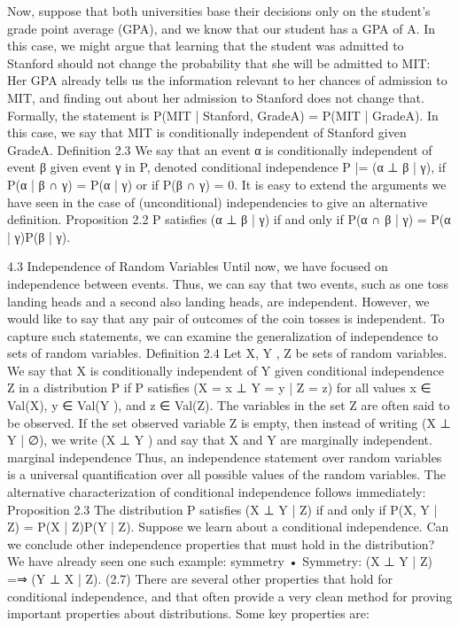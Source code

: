 Now, suppose that both universities base their decisions only on the student’s grade point average (GPA), and we know that our student has a GPA of A. In this case, we might argue that learning that the student was admitted to Stanford should not change the probability that she will be admitted to MIT: Her GPA already tells us the information relevant to her chances of admission to MIT, and finding out about her admission to Stanford does not change that. Formally, the statement is P(MIT | Stanford, GradeA) = P(MIT | GradeA). In this case, we say that MIT is conditionally independent of Stanford given GradeA. Definition 2.3 We say that an event α is conditionally independent of event β given event γ in P, denoted conditional independence P |= (α ⊥ β | γ), if P(α | β ∩ γ) = P(α | γ) or if P(β ∩ γ) = 0. It is easy to extend the arguments we have seen in the case of (unconditional) independencies to give an alternative definition. Proposition 2.2 P satisfies (α ⊥ β | γ) if and only if P(α ∩ β | γ) = P(α | γ)P(β | γ).

4.3 Independence of Random Variables
Until now, we have focused on independence between events. Thus, we can say that two events, such as one toss landing heads and a second also landing heads, are independent. However, we would like to say that any pair of outcomes of the coin tosses is independent. To capture such statements, we can examine the generalization of independence to sets of random variables. Definition 2.4 Let X, Y , Z be sets of random variables. We say that X is conditionally independent of Y given conditional independence Z in a distribution P if P satisfies (X = x ⊥ Y = y | Z = z) for all values x ∈ Val(X), y ∈ Val(Y ), and z ∈ Val(Z). The variables in the set Z are often said to be observed. If the set observed variable Z is empty, then instead of writing (X ⊥ Y | ∅), we write (X ⊥ Y ) and say that X and Y are marginally independent. marginal independence Thus, an independence statement over random variables is a universal quantification over all possible values of the random variables. The alternative characterization of conditional independence follows immediately: Proposition 2.3 The distribution P satisfies (X ⊥ Y | Z) if and only if P(X, Y | Z) = P(X | Z)P(Y | Z). Suppose we learn about a conditional independence. Can we conclude other independence properties that must hold in the distribution? We have already seen one such example: symmetry • Symmetry: (X ⊥ Y | Z) =⇒ (Y ⊥ X | Z). (2.7) There are several other properties that hold for conditional independence, and that often provide a very clean method for proving important properties about distributions. Some key properties are:

